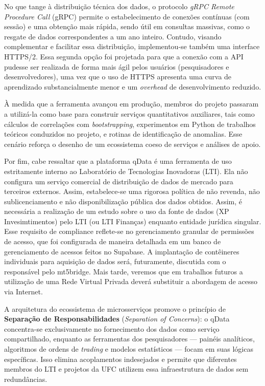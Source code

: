 No que tange à distribuição técnica dos dados, o protocolo \textit{gRPC Remote Procedure Call} (gRPC) permite o estabelecimento de conexões contínuas (com sessão) e uma obtenção mais rápida, sendo útil em consultas massivas, como o resgate de dados correspondentes a um ano inteiro. Contudo, visando complementar e facilitar essa distribuição, implementou-se também uma interface HTTPS/2. Essa segunda opção foi projetada para que a conexão com a API pudesse ser realizada de forma mais ágil pelos usuários (pesquisadores e desenvolvedores), uma vez que o uso de HTTPS apresenta uma curva de aprendizado substancialmente menor e um \textit{overhead} de desenvolvimento reduzido.



À medida que a ferramenta avançou em produção, membros do projeto passaram a utilizá-la como base para construir serviços quantitativos auxiliares, tais como cálculos de correlações com \textit{bootstrapping}, experimentos em Python de trabalhos teóricos conduzidos no projeto, e rotinas de identificação de anomalias. Esse cenário reforça o desenho de um ecossistema coeso de serviços e análises de apoio.

Por fim, cabe ressaltar que a plataforma qData é uma ferramenta de uso estritamente interno ao Laboratório de Tecnologias Inovadoras (LTI). Ela não configura um serviço comercial de distribuição de dados de mercado para terceiros externos. Assim, estabelece-se uma rigorosa política de não revenda, não sublicenciamento e não disponibilização pública dos dados obtidos. Assim, é necessária a realização de um estudo sobre o uso da fonte de dados (XP Invesimtimentos) pelo LTI (ou LTI Finanças) enquanto entidade jurídica singular. Esse requisito de compliance reflete-se no gerenciamento granular de permissões de acesso, que foi configurada de maneira detalhada em um banco de gerenciamento de acessos feitos no Supabase. A implantação de contêineres individuais para aquisição de dados será, futuramente, discutida com o responsável pelo mt5bridge. Mais tarde, veremos que em trabalhos futuros a utilização de uma Rede Virtual Privada deverá substituir a abordagem de acesso via Internet.

A arquitetura do ecossistema de microsserviços promove o princípio de \textbf{Separação de Responsabilidades} (\textit{Separation of Concerns}): o qData concentra-se exclusivamente no fornecimento dos dados como serviço compartilhado, enquanto as ferramentas dos pesquisadores — painéis analíticos, algoritmos de ordens de \textit{trading} e modelos estatísticos — focam em suas lógicas específicas. Isso elimina acoplamentos indesejados e permite que diferentes membros do LTI e projetos da UFC utilizem essa infraestrutura de dados sem redundâncias.

